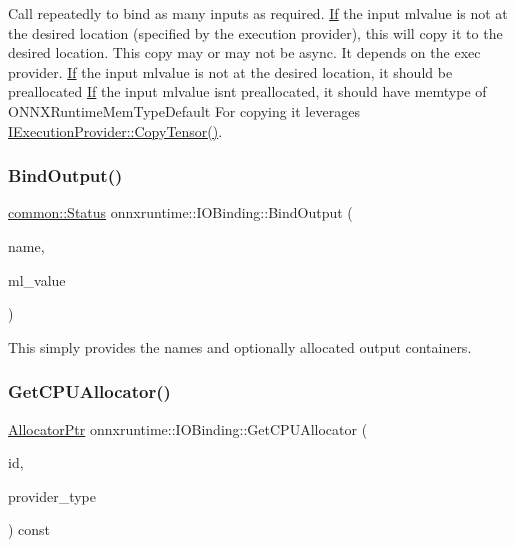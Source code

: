 Call repeatedly to bind as many inputs as required. \mbox{\hyperlink{classonnxruntime_1_1If}{If}} the input mlvalue is not at the desired location (specified by the execution provider), this will copy it to the desired location. This copy may or may not be async. It depends on the exec provider. \mbox{\hyperlink{classonnxruntime_1_1If}{If}} the input mlvalue is not at the desired location, it should be preallocated \mbox{\hyperlink{classonnxruntime_1_1If}{If}} the input mlvalue isn\textquotesingle{}t preallocated, it should have memtype of O\+N\+N\+X\+Runtime\+Mem\+Type\+Default For copying it leverages \mbox{\hyperlink{classonnxruntime_1_1IExecutionProvider_a2b9bb47c0d2d72598ceb381688adfe26}{I\+Execution\+Provider\+::\+Copy\+Tensor()}}. \mbox{\label{classonnxruntime_1_1IOBinding_ad060d48245f5873694878e419cd2fdc9}} 
\subsubsection{\texorpdfstring{Bind\+Output()}{BindOutput()}}
{\footnotesize\ttfamily \mbox{\hyperlink{classonnxruntime_1_1common_1_1Status}{common\+::\+Status}} onnxruntime\+::\+I\+O\+Binding\+::\+Bind\+Output (\begin{DoxyParamCaption}\item[{const std\+::string \&}]{name,  }\item[{const \mbox{\hyperlink{classonnxruntime_1_1MLValue}{M\+L\+Value}} \&}]{ml\+\_\+value }\end{DoxyParamCaption})}

This simply provides the names and optionally allocated output containers. \mbox{\label{classonnxruntime_1_1IOBinding_a1210c428eaa9cf938914c9e38e6b9a77}} 
\subsubsection{\texorpdfstring{Get\+C\+P\+U\+Allocator()}{GetCPUAllocator()}}
{\footnotesize\ttfamily \mbox{\hyperlink{namespaceonnxruntime_a6cdac724c5dcefded3a63f08dae58fda}{Allocator\+Ptr}} onnxruntime\+::\+I\+O\+Binding\+::\+Get\+C\+P\+U\+Allocator (\begin{DoxyParamCaption}\item[{int}]{id,  }\item[{\mbox{\hyperlink{namespaceonnxruntime_a863e2227cbf32aab76aad35fdadff4bb}{onnxruntime\+::\+Provider\+Type}}}]{provider\+\_\+type }\end{DoxyParamCaption}) const}

